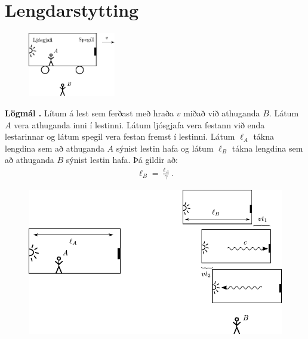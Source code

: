 \ifdefined \wholebook \else\documentclass[oneside]{book}\usepackage{EdlBook}\graphicspath{{figures/}}
\begin{document}
\section{Lengdarstytting}

\setcounter{theorem}{8}

\begin{tcolorbox}
\begin{minipage}{\linewidth}

\begin{figure}
\vspace{-0.5cm}
\includegraphics[width = 1.5in]{figures/trains-einstein2.pdf}
\end{figure}
\textbf{Lögmál \thetheorem.} Lítum á lest sem ferðast með hraða $v$ miðað við athuganda $B$. Látum $A$ vera athuganda inni í lestinni. Látum ljósgjafa vera festann við enda lestarinnar og látum spegil vera festan fremst í lestinni. Látum $\ell_A$ tákna lengdina sem að athuganda $A$ sýnist lestin hafa og látum $\ell_B$ tákna lengdina sem að athuganda $B$ sýnist lestin hafa. Þá gildir að:
\begin{align*}
    \ell_B = \frac{\ell_A}{\gamma}.
\end{align*}
\end{minipage}
\end{tcolorbox}

\begin{figure}[H]
    \centering
    \includegraphics[scale = 0.7]{figures/trains-einstein2b.pdf}
\end{figure}
\end{document}
